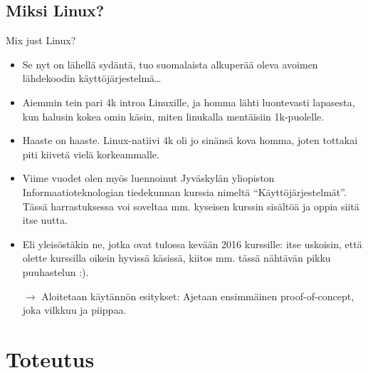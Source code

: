\documentclass[pdf,10pt,handout]{beamer}
\begin{document}
\subsection{Miksi Linux?}
\begin{frame}{Mix just Linux?}
  \begin{itemize}
    \item Se nyt on lähellä sydäntä, tuo suomalaista alkuperää oleva
      avoimen lähdekoodin käyttöjärjestelmä\ldots
    \item Aiemmin tein pari 4k introa Linuxille, ja homma lähti
      luontevasti lapasesta, kun halusin kokea omin käsin, miten
      linukalla mentäisiin 1k-puolelle.
    \item Haaste on haaste. Linux-natiivi 4k oli jo sinänsä kova
      homma, joten tottakai piti kiivetä vielä korkeammalle.
    \item Viime vuodet olen myös luennoinut Jyväskylän yliopiston
      Informaatioteknologian tiedekunnan kurssia nimeltä
      ``Käyttöjärjestelmät''. Tässä harrastuksessa voi soveltaa mm.
      kyseisen kurssin sisältöä ja oppia siitä itse uutta.
    \item Eli yleisöstäkin ne, jotka ovat tulossa kevään 2016
      kurssille: itse uskoisin, että olette kurssilla oikein hyvissä
      käsissä, kiitos mm. tässä nähtävän pikku puuhastelun :).
    \item[$\rightarrow$] Aloitetaan käytännön esitykset: Ajetaan
      ensimmäinen proof-of-concept, joka vilkkuu ja piippaa.
  \end{itemize}
\end{frame}

\section{Toteutus}
\end{document}
